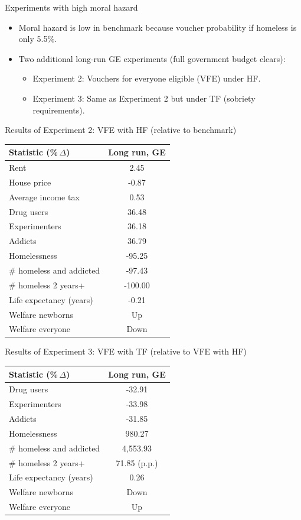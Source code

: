 \documentclass[10pt,aspectratio=169]{beamer}
\begin{document}
\begin{frame}{Experiments with high moral hazard}
\begin{itemize}
\item Moral hazard is low in benchmark because voucher probability if homeless is only 5.5\%.
\item Two additional long-run GE experiments (full government budget clears):
\begin{itemize}
\item Experiment 2: Vouchers for everyone eligible (VFE) under HF.
\item Experiment 3: Same as Experiment 2 but under TF (sobriety requirements).
\end{itemize}
\end{itemize}
\end{frame}

\begin{frame}{Results of Experiment 2: VFE with HF (relative to benchmark)}
\small
\begin{table}
\centering
\begin{tabular}{lc}
\toprule
Statistic (\%\,$\Delta$) & Long run, GE\\
\midrule
Rent & 2.45\\
House price & -0.87\\
Average income tax & 0.53\\
Drug users & 36.48\\
Experimenters & 36.18\\
Addicts & 36.79\\
Homelessness & -95.25\\
\# homeless and addicted & -97.43\\
\# homeless 2 years+ & -100.00\\
Life expectancy (years) & -0.21\\
Welfare newborns & Up\\
Welfare everyone & Down\\
\bottomrule
\end{tabular}
\end{table}
\end{frame}

\begin{frame}{Results of Experiment 3: VFE with TF (relative to VFE with HF)}
\small
\begin{table}
\centering
\begin{tabular}{lc}
\toprule
Statistic (\%\,$\Delta$) & Long run, GE\\
\midrule
Drug users & -32.91\\
Experimenters & -33.98\\
Addicts & -31.85\\
Homelessness & 980.27\\
\# homeless and addicted & 4{,}553.93\\
\# homeless 2 years+ & 71.85 (p.p.)\\
Life expectancy (years) & 0.26\\
Welfare newborns & Down\\
Welfare everyone & Up\\
\bottomrule
\end{tabular}
\end{table}
\end{frame}
\end{document}
